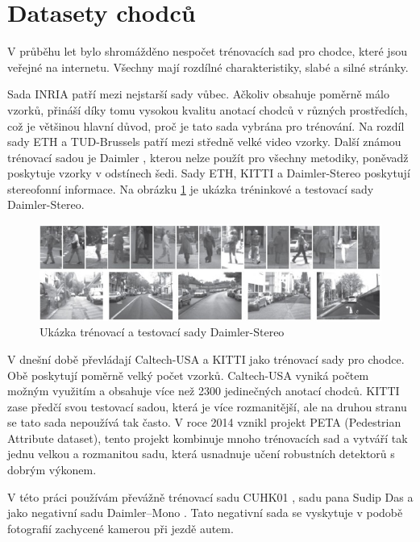 \section{Datasety chodců} 
V průběhu let bylo shromážděno nespočet trénovacích sad pro chodce, které jsou veřejné na internetu. Všechny mají rozdílné charakteristiky, slabé a silné stránky. 

Sada INRIA \cite{inria} patří mezi nejstarší sady vůbec. Ačkoliv obsahuje poměrně málo vzorků, přináší díky tomu vysokou kvalitu anotací chodců v různých prostředích, což je většinou hlavní důvod, proč je tato sada vybrána pro trénování. Na rozdíl sady ETH \cite{eth} a TUD-Brussels \cite{tudbrussels} patří mezi středně velké video vzorky. Další známou trénovací sadou je Daimler \cite{daimler}, kterou nelze použít pro všechny metodiky, poněvadž poskytuje vzorky v odstínech šedi. Sady ETH, KITTI \cite{kitti} a Daimler-Stereo \cite{daimlerstereo} poskytují stereofonní informace. Na obrázku \ref{fig:daimler_stereo} je ukázka tréninkové a testovací sady Daimler-Stereo. 

\begin{figure}[H]
\centering
\includegraphics[width=16cm]{figures/daimler_stereo}
\caption{Ukázka trénovací a testovací sady Daimler-Stereo \cite{daimlerstereo}}
\label{fig:daimler_stereo}
\end{figure}

V dnešní době převládají Caltech-USA \cite{caltech} a KITTI jako trénovací sady pro chodce. Obě poskytují poměrně velký počet vzorků. Caltech-USA vyniká počtem možným využitím a obsahuje více než 2300 jedinečných anotací chodců. KITTI zase předčí svou testovací sadou, která je více rozmanitější, ale na druhou stranu se tato sada nepoužívá tak často. V roce 2014 vznikl projekt PETA (Pedestrian Attribute dataset)\cite{peta}, tento projekt kombinuje mnoho trénovacích sad a vytváří tak jednu velkou a rozmanitou sadu, která usnadnuje učení robustních detektorů s dobrým výkonem.

V této práci používám převážně trénovací sadu CUHK01 \cite{cuhk}, sadu pana Sudip Das \cite{sudipdas} a jako negativní sadu Daimler--Mono \cite{daimler}. Tato negativní sada se vyskytuje v podobě fotografií zachycené kamerou při jezdě autem. 

